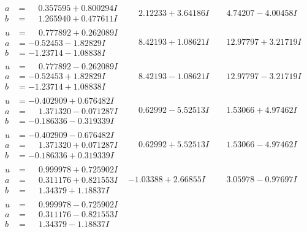 \documentclass[1p]{elsarticle_modified}
\theoremstyle{definition}
\begin{document}
$$\begin{array}{c|c|c}
\begin{aligned}
a &= \phantom{-}0.357595 + 0.800294 I \\
b &= \phantom{-}1.265940 + 0.477611 I\end{aligned}
 & \phantom{-}2.12233 + 3.64186 I & \phantom{-}4.74207 - 4.00458 I \\ \hline\begin{aligned}
u &= \phantom{-}0.777892 + 0.262089 I \\
a &= -0.52453 - 1.82829 I \\
b &= -1.23714 - 1.08838 I\end{aligned}
 & \phantom{-}8.42193 + 1.08621 I & \phantom{-}12.97797 + 3.21719 I \\ \hline\begin{aligned}
u &= \phantom{-}0.777892 - 0.262089 I \\
a &= -0.52453 + 1.82829 I \\
b &= -1.23714 + 1.08838 I\end{aligned}
 & \phantom{-}8.42193 - 1.08621 I & \phantom{-}12.97797 - 3.21719 I \\ \hline\begin{aligned}
u &= -0.402909 + 0.676482 I \\
a &= \phantom{-}1.371320 - 0.071287 I \\
b &= -0.186336 - 0.319339 I\end{aligned}
 & \phantom{-}0.62992 - 5.52513 I & \phantom{-}1.53066 + 4.97462 I \\ \hline\begin{aligned}
u &= -0.402909 - 0.676482 I \\
a &= \phantom{-}1.371320 + 0.071287 I \\
b &= -0.186336 + 0.319339 I\end{aligned}
 & \phantom{-}0.62992 + 5.52513 I & \phantom{-}1.53066 - 4.97462 I \\ \hline\begin{aligned}
u &= \phantom{-}0.999978 + 0.725902 I \\
a &= \phantom{-}0.311176 + 0.821553 I \\
b &= \phantom{-}1.34379 + 1.18837 I\end{aligned}
 & -1.03388 + 2.66855 I & \phantom{-}3.05978 - 0.97697 I \\ \hline\begin{aligned}
u &= \phantom{-}0.999978 - 0.725902 I \\
a &= \phantom{-}0.311176 - 0.821553 I \\
b &= \phantom{-}1.34379 - 1.18837 I\end{aligned}

\end{array}$$
\end{document}
